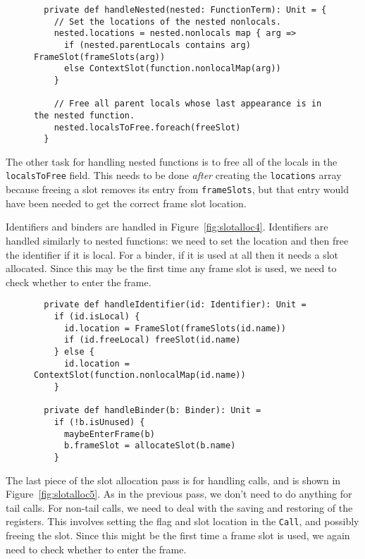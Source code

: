 \begin{figure}
\begin{verbatim}
  private def handleNested(nested: FunctionTerm): Unit = {
    // Set the locations of the nested nonlocals.
    nested.locations = nested.nonlocals map { arg =>
      if (nested.parentLocals contains arg) FrameSlot(frameSlots(arg))
      else ContextSlot(function.nonlocalMap(arg))
    }

    // Free all parent locals whose last appearance is in the nested function.
    nested.localsToFree.foreach(freeSlot)
  }
\end{verbatim}
\getcaption
\end{figure}

The other task for handling nested functions is to free all of the locals
in the \verb!localsToFree! field.
This needs to be done \emph{after} creating the \verb!locations! array
because freeing a slot removes its entry from \verb!frameSlots!,
but that entry would have been needed to get the correct frame slot location.

Identifiers and binders are handled in Figure~\ref{fig:slotalloc4}.
Identifiers are handled similarly to nested functions:
we need to set the location and then free the identifier if it is local.
For a binder, if it is used at all then it needs a slot allocated.
Since this may be the first time any frame slot is used,
we need to check whether to enter the frame.

\begin{figure}
\begin{verbatim}
  private def handleIdentifier(id: Identifier): Unit =
    if (id.isLocal) {
      id.location = FrameSlot(frameSlots(id.name))
      if (id.freeLocal) freeSlot(id.name)
    } else {
      id.location = ContextSlot(function.nonlocalMap(id.name))
    }

  private def handleBinder(b: Binder): Unit =
    if (!b.isUnused) {
      maybeEnterFrame(b)
      b.frameSlot = allocateSlot(b.name)
    }
\end{verbatim}
\getcaption
\end{figure}

The last piece of the slot allocation pass is for handling calls,
and is shown in Figure~\ref{fig:slotalloc5}.
As in the previous pass, we don't need to do anything for tail calls.
For non-tail calls,
we need to deal with the saving and restoring of the registers.
This involves setting the flag and slot location in the \verb!Call!,
and possibly freeing the slot.
Since this might be the first time a frame slot is used,
we again need to check whether to enter the frame.

